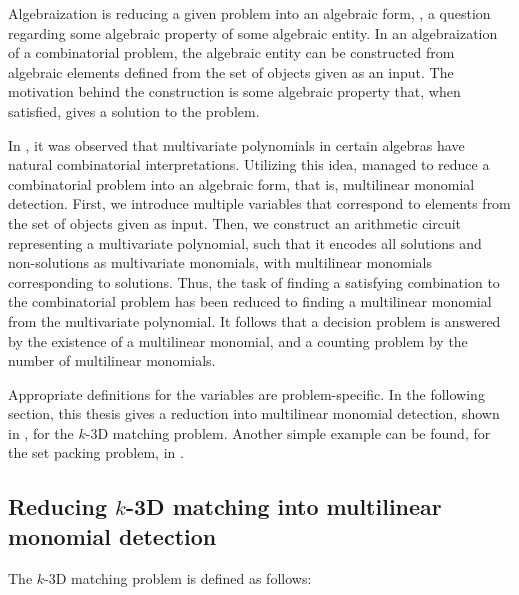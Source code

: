 
Algebraization is reducing a given problem into an algebraic form,
, a
question regarding some algebraic property of some algebraic entity. 
In an algebraization of a combinatorial problem, the algebraic entity can be constructed from algebraic elements defined from the 
set of objects given as an input. The motivation behind the construction is some algebraic property that, 
when satisfied, gives a solution to the problem.

In \cite{Valiant92}, it was observed that multivariate polynomials in certain algebras have natural combinatorial interpretations. 
Utilizing this idea, \cite{Koutis05} managed to reduce a combinatorial problem
into an algebraic form, that is, multilinear monomial detection. 
First, we introduce multiple variables that 
correspond to elements from the set of objects given as input. 
Then, we construct an arithmetic circuit representing a multivariate polynomial, such that it 
encodes all solutions and non-solutions as multivariate monomials, 
with multilinear monomials corresponding to solutions. 
Thus, the task of finding a satisfying combination to the combinatorial problem has been reduced to 
finding a multilinear monomial from the multivariate polynomial.
It follows that a decision problem is answered by 
the existence of a multilinear monomial, and a counting problem by the number of multilinear monomials.

Appropriate definitions for the variables are problem-specific. In the following section, this thesis gives a 
reduction into multilinear monomial detection, shown in \cite{KouWil15}, 
for the $k$-3D matching problem. Another simple example can be found, for the set packing problem, in \cite{Koutis05}.


\subsection{Reducing $k$-3D matching into multilinear monomial detection}

The $k$-3D matching problem is defined as follows:

